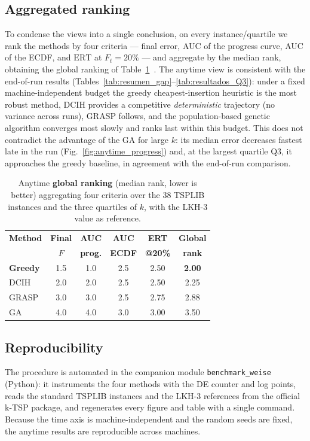 \subsection{Aggregated ranking}
To condense the views into a single conclusion, on every instance/quartile we rank
the methods by four criteria --- final error, AUC of the progress curve, AUC of the
ECDF, and $\mathrm{ERT}$ at $F_t=20\%$ --- and aggregate by the median rank,
obtaining the global ranking of Table~\ref{tab:anytime_ranking}~\cite{weise2014benchmarking}.
The anytime view is consistent with the end-of-run results
(Tables~\ref{tab:resumen_gap}--\ref{tab:resultados_Q3}): under a fixed
machine-independent budget the greedy cheapest-insertion heuristic is the most
robust method, DCIH provides a competitive \emph{deterministic} trajectory (no
variance across runs), GRASP follows, and the population-based genetic algorithm
converges most slowly and ranks last within this budget. This does not contradict
the advantage of the GA for large $k$: its median error decreases fastest late in
the run (Fig.~\ref{fig:anytime_progress}) and, at the largest quartile Q3, it
approaches the greedy baseline, in agreement with the end-of-run comparison.

\begin{table}[htbp]
\centering
\caption{Anytime \textbf{global ranking} (median rank, lower is better) aggregating
four criteria over the 38 TSPLIB instances and the three quartiles of $k$, with the
LKH-3 value as reference.}
\label{tab:anytime_ranking}
\begin{tabular}{|l|c|c|c|c|c|}
\hline
\textbf{Method} & \textbf{Final} & \textbf{AUC} & \textbf{AUC} & \textbf{ERT} & \textbf{Global} \\
                & \textbf{$F$}   & \textbf{prog.}& \textbf{ECDF}& \textbf{@20\%}& \textbf{rank} \\
\hline
\textbf{Greedy} & 1.5 & 1.0 & 2.5 & 2.50 & \textbf{2.00} \\
DCIH            & 2.0 & 2.0 & 2.5 & 2.50 & 2.25 \\
GRASP           & 3.0 & 3.0 & 2.5 & 2.75 & 2.88 \\
GA              & 4.0 & 4.0 & 3.0 & 3.00 & 3.50 \\
\hline
\end{tabular}
\end{table}

\subsection{Reproducibility}
The procedure is automated in the companion module \texttt{benchmark\_weise}
(Python): it instruments the four methods with the DE counter and log points, reads
the standard TSPLIB instances and the LKH-3 references from the official k-TSP
package, and regenerates every figure and table with a single command. Because the
time axis is machine-independent and the random seeds are fixed, the anytime
results are reproducible across machines.


